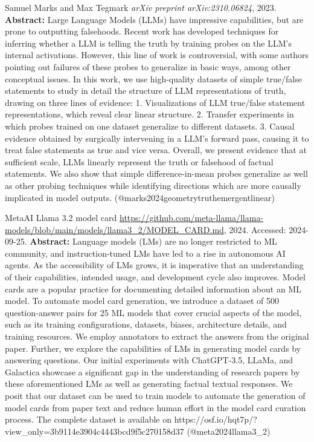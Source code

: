 \documentclass{article} %
\begin{document}
\begin{thebibliography}{}
 Samuel Marks and Max Tegmark  \newblock \emph{arXiv preprint arXiv:2310.06824}, 2023. \newblock \textbf{Abstract:} Large Language Models (LLMs) have impressive capabilities, but are prone to outputting falsehoods. Recent work has developed techniques for inferring whether a LLM is telling the truth by training probes on the LLM's internal activations. However, this line of work is controversial, with some authors pointing out failures of these probes to generalize in basic ways, among other conceptual issues. In this work, we use high-quality datasets of simple true/false statements to study in detail the structure of LLM representations of truth, drawing on three lines of evidence: 1. Visualizations of LLM true/false statement representations, which reveal clear linear structure. 2. Transfer experiments in which probes trained on one dataset generalize to different datasets. 3. Causal evidence obtained by surgically intervening in a LLM's forward pass, causing it to treat false statements as true and vice versa. Overall, we present evidence that at sufficient scale, LLMs linearly represent the truth or falsehood of factual statements. We also show that simple difference-in-mean probes generalize as well as other probing techniques while identifying directions which are more causally implicated in model outputs. \newblock (@marks2024geometrytruthemergentlinear)

 MetaAI \newblock Llama 3.2 model card \newblock \url{https://github.com/meta-llama/llama-models/blob/main/models/llama3_2/MODEL_CARD.md}, 2024. \newblock Accessed: 2024-09-25. \newblock \textbf{Abstract:} Language models (LMs) are no longer restricted to ML community, and instruction-tuned LMs have led to a rise in autonomous AI agents. As the accessibility of LMs grows, it is imperative that an understanding of their capabilities, intended usage, and development cycle also improves. Model cards are a popular practice for documenting detailed information about an ML model. To automate model card generation, we introduce a dataset of 500 question-answer pairs for 25 ML models that cover crucial aspects of the model, such as its training configurations, datasets, biases, architecture details, and training resources. We employ annotators to extract the answers from the original paper. Further, we explore the capabilities of LMs in generating model cards by answering questions. Our initial experiments with ChatGPT-3.5, LLaMa, and Galactica showcase a significant gap in the understanding of research papers by these aforementioned LMs as well as generating factual textual responses. We posit that our dataset can be used to train models to automate the generation of model cards from paper text and reduce human effort in the model card curation process. The complete dataset is available on https://osf.io/hqt7p/?view\_only=3b9114e3904c4443bcd9f5c270158d37 \newblock (@meta2024llama3\_2)


\end{thebibliography}
\end{document}
